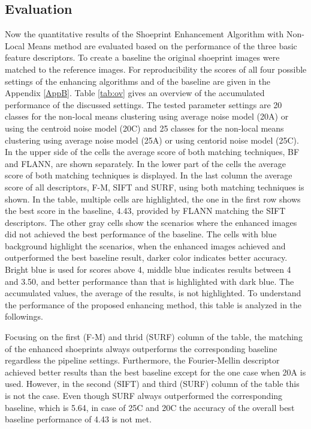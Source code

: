 \documentclass[draft,final]{vutinfth} %
\begin{document}
\subsection{Evaluation}
\par
Now the quantitative results of the Shoeprint Enhancement Algorithm with Non-Local Means method are evaluated based on the performance of  the three basic feature descriptors.
To create a baseline the original shoeprint images were matched to the reference images.
For reproducibility the scores of all four possible settings  of the enhancing algorithms and of the baseline are given in the Appendix \ref{AppB}.
Table \ref{tab:ov} gives an overview of the accumulated performance of the discussed settings.
The tested parameter settings are 20 classes for the non-local means clustering using average noise model (20A) or using the centroid noise model (20C) and 25 classes for the non-local means clustering using average noise model (25A) or using centorid noise model (25C).
In the upper side of the cells the average score of both matching techniques, BF and FLANN, are shown separately.
In the lower part of the cells the average score of both matching techniques is displayed.
In the last column the average score of all descriptors, F-M, SIFT and SURF, using both matching techniques is shown.
In the table, multiple cells are highlighted, the one in the first row shows the best score in the baseline, 4.43, provided by FLANN matching the SIFT descriptors.
The other gray cells show the scenarios where the enhanced images did not achieved the best performance of the baseline.
The cells with blue background highlight the scenarios, when the enhanced images achieved and outperformed the best baseline result, darker color indicates better accuracy.
Bright blue is used for scores above 4, middle blue indicates results between 4 and 3.50, and better performance than that is highlighted with dark blue.
The accumulated values, the average of the results, is not highlighted.
To understand the performance of the proposed enhancing method, this table is analyzed in the followings.
\par
Focusing on the first (F-M)  and thrid (SURF) column of the table, the matching of the enhanced shoeprints always outperforms the corresponding baseline regardless the pipeline settings.
Furthermore, the Fourier-Mellin descriptor achieved better results than the best baseline  except for the one case when 20A is used. 
However, in the second (SIFT) and third (SURF) column of the table this is not the case.
Even though SURF always outperformed the corresponding baseline, which is 5.64, in case of 25C and 20C the accuracy of the overall best baseline performance of 4.43 is not met.
\end{document}
